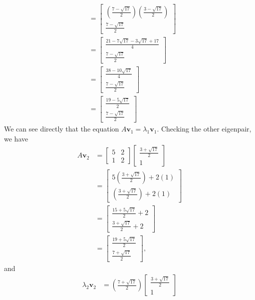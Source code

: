 \documentclass[]{exam}
\numberwithin{equation}{section}
\begin{document}
\begin{questions}
\begin{parts}
\begin{align*}
	& = \begin{bmatrix} \left(\frac{7 - \sqrt{17}}{2}\right)\left(\frac{3- \sqrt{17}}{2}\right) \\ \frac{7 - \sqrt{17}}{2} \end{bmatrix} \\ 
	& = \begin{bmatrix} \frac{21 - 7\sqrt{17} - 3\sqrt{17} + 17 }{4} \\  \frac{7 - \sqrt{17}}{2} \end{bmatrix} \\ 
	& = \begin{bmatrix} \frac{38 - 10\sqrt{17} }{4} \\  \frac{7 - \sqrt{17}}{2} \end{bmatrix}\\
	& = \begin{bmatrix} \frac{19 - 5\sqrt{17} }{2} \\  \frac{7 - \sqrt{17}}{2} \end{bmatrix}\end{align*}
We can see directly that the equation $A\boldsymbol{v}_1 = \lambda_1 \boldsymbol{v}_1$.  Checking the other eigenpair, we have 
\begin{align*} 
A \boldsymbol{v}_2 & = \begin{bmatrix} 5 & 2 \\ 1 & 2 \end{bmatrix} \begin{bmatrix} \frac{3+ \sqrt{17}}{2} \\ 1 \end{bmatrix} \\ 
	& = \begin{bmatrix} 5\left(  \frac{3+\sqrt{17}}{2} \right) + 2 (1) \\ \left( \frac{3+\sqrt{17}}{2} \right) + 2 (1) \end{bmatrix} \\ 
	& = \begin{bmatrix}  \frac{15+ 5\sqrt{17}}{2} +2 \\  \frac{3+ \sqrt{17}}{2}  + 2 \end{bmatrix} \\
	& = \begin{bmatrix}  \frac{19+5\sqrt{17}}{2}  \\  \frac{7+ \sqrt{17}}{2}  \end{bmatrix},\end{align*}
and 
\begin{align*} 
\lambda_2 \boldsymbol{v}_2 & = \left(\frac{7 + \sqrt{17}}{2}\right) \begin{bmatrix} \frac{3+ \sqrt{17}}{2} \\ 1 \end{bmatrix} \\ 

\end{align*}
\end{parts}
\end{questions}
\end{document}
